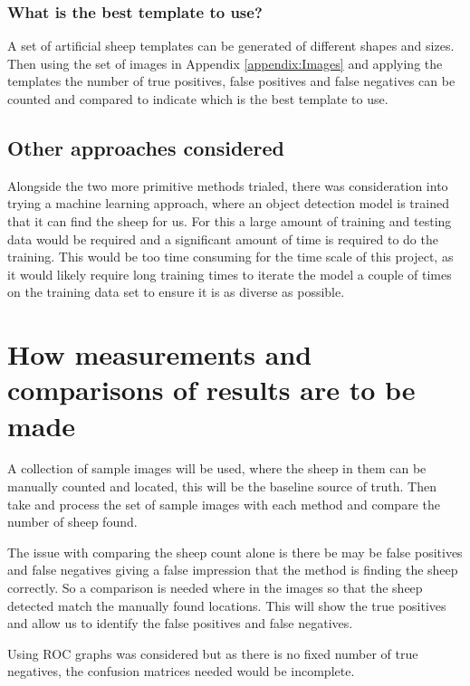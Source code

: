 \subsubsection{What is the best template to use?}

A set of artificial sheep templates can be generated of different shapes and sizes. Then using the set of images in Appendix \ref{appendix:Images} and applying the templates the number of true positives, false positives and false negatives can be counted and compared to indicate which is the best template to use. 

\subsection{Other approaches considered}

Alongside the two more primitive methods trialed, there was consideration into trying a machine learning approach, where an object detection model is trained that it can find the sheep for us. 
For this a large amount of training and testing data would be required and a significant amount of time is required to do the training. 
This would be too time consuming for the time scale of this project, as it would likely require long training times to iterate the model a couple of times on the training data set to ensure it is as diverse as possible.

\section{How measurements and comparisons of results are to be made}
A collection of sample images will be used, where the sheep in them can be manually counted and located, this will be the baseline source of truth. Then take and process the set of sample images with each method and compare the number of sheep found. 

The issue with comparing the sheep count alone is there be may be false positives and false negatives giving a false impression that the method is finding the sheep correctly. So a comparison is needed where in the images so that the sheep detected match the manually found locations. This will show the true positives and allow us to identify the false positives and false negatives.

Using ROC graphs was considered but as there is no fixed number of true negatives, the confusion matrices needed would be incomplete. 

